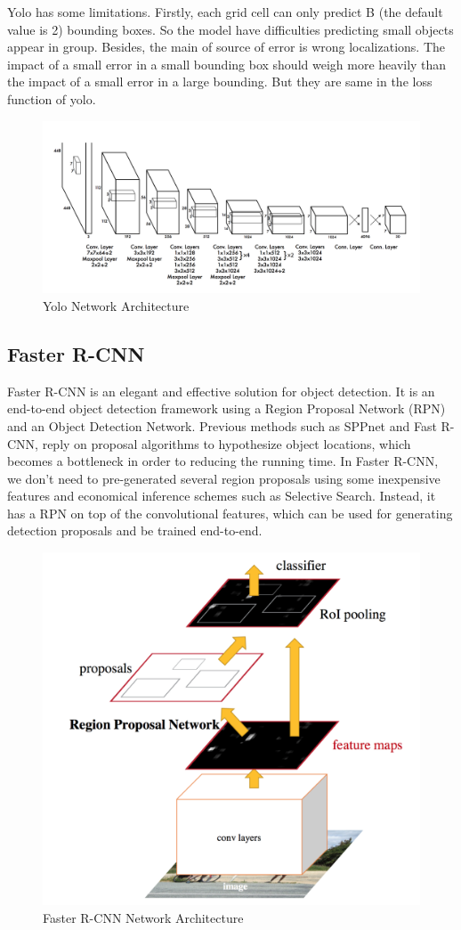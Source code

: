 Yolo has some limitations. Firstly, each grid cell can only predict B (the default value is 2) bounding boxes. So the model have difficulties predicting small objects appear in group. Besides, the main of source of error is wrong localizations. The impact of a small error in a small bounding box should weigh more heavily than the impact of a small error in a large bounding. But they are same in the loss function of yolo. 
\begin{figure}[H]
    \centering
    \includegraphics[width=1.0\linewidth]{img/yolo_network.png}
    \caption{Yolo Network Architecture}
\end{figure}%


\subsection{Faster R-CNN}
Faster R-CNN is an elegant and effective solution for object detection. 
It is an end-to-end object detection framework using a Region Proposal Network (RPN) and an Object Detection Network. Previous methods such as SPPnet and Fast R-CNN, reply on proposal algorithms to hypothesize object locations, which becomes a bottleneck in order to reducing the running time. In Faster R-CNN, we don't need to pre-generated several region proposals using some inexpensive features and economical inference schemes such as Selective Search. Instead, it has a RPN on top of the convolutional features, which can be used for generating detection proposals and be trained end-to-end. 

\begin{figure}[H]
    \centering
    \includegraphics[width=0.4\linewidth]{img/FRCNN_network.png}
    \caption{Faster R-CNN Network Architecture}
\end{figure}%

